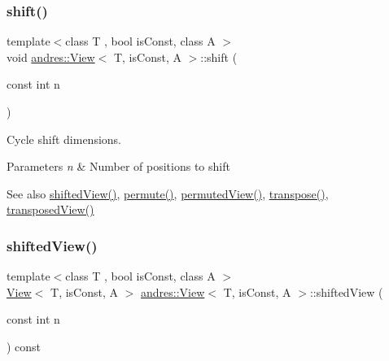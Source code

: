 \subsubsection{\texorpdfstring{shift()}{shift()}}
{\footnotesize\ttfamily template$<$class T , bool is\+Const, class A $>$ \\
void \hyperlink{classandres_1_1View}{andres\+::\+View}$<$ T, is\+Const, A $>$\+::shift (\begin{DoxyParamCaption}\item[{const int}]{n }\end{DoxyParamCaption})\hspace{0.3cm}{\ttfamily [inline]}}

Cycle shift dimensions.


\begin{DoxyParams}{Parameters}
{\em n} & Number of positions to shift \\
\hline
\end{DoxyParams}
\begin{DoxySeeAlso}{See also}
\hyperlink{classandres_1_1View_abc938823dc964548f0f44ab10bca6b59}{shifted\+View()}, \hyperlink{classandres_1_1View_a375d3e199e219568d8a6205e4088289b}{permute()}, \hyperlink{classandres_1_1View_ad5ff9254de815d85b6c6748bad3fcd89}{permuted\+View()}, \hyperlink{classandres_1_1View_ad7acad354a5be4086b9b21ab88b18d82}{transpose()}, \hyperlink{classandres_1_1View_a98a4c17bd2faa51788f6fd533a429e73}{transposed\+View()} 
\end{DoxySeeAlso}
\mbox{\label{classandres_1_1View_abc938823dc964548f0f44ab10bca6b59}} 
\subsubsection{\texorpdfstring{shifted\+View()}{shiftedView()}}
{\footnotesize\ttfamily template$<$class T , bool is\+Const, class A $>$ \\
\hyperlink{classandres_1_1View}{View}$<$ T, is\+Const, A $>$ \hyperlink{classandres_1_1View}{andres\+::\+View}$<$ T, is\+Const, A $>$\+::shifted\+View (\begin{DoxyParamCaption}\item[{const int}]{n }\end{DoxyParamCaption}) const\hspace{0.3cm}{\ttfamily [inline]}}

